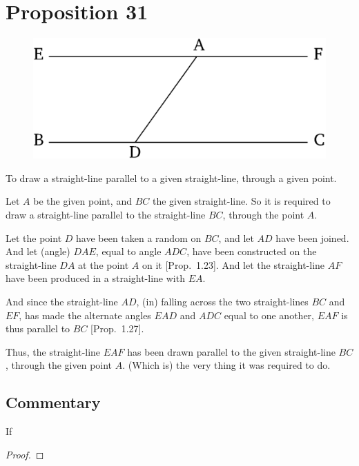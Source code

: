 \chapter*{Proposition 31}



\begin{figure}[ht]
    \begin{center}
    \includegraphics[width=0.5\linewidth]{figures/fig31e.eps}
    \label{fig:prop_31}
    \end{center}
\end{figure}

To draw a straight-line parallel to a given straight-line, through a given
point.

Let $A$ be the given point, and $BC$ the given straight-line. So it is
required to draw a straight-line parallel to the straight-line $BC$, through
the point $A$.

Let the point $D$ have been taken a random  on $BC$, and let $AD$ have been
joined. And let (angle) $DAE$, equal to angle $ADC$,  have been constructed 
on the straight-line $DA$ at the point $A$ on it [Prop.~1.23]. And let the
straight-line $AF$ have been
produced in a straight-line with $EA$.

And since the straight-line $AD$, (in) falling across the two straight-lines
$BC$ and $EF$,  has made the alternate
angles $EAD$ and $ADC$ equal to one another, $EAF$ is thus parallel to $BC$
[Prop.~1.27].

Thus, the straight-line $EAF$ has been drawn parallel to the given straight-line $BC$, through the  given
point $A$. (Which is) the very thing it was required to do.


\section*{Commentary}

\begin{proposition}\label{proposition_31}\leanok
    If
\end{proposition}
\begin{proof}
    \leanok
\end{proof}
